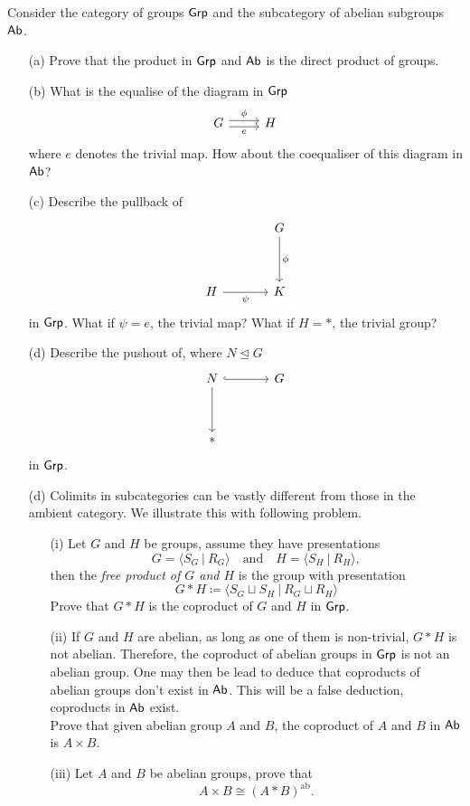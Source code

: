 \begin{problem}\label{prob 6.5}
Consider the category of groups $\mathsf{Grp}$ and the subcategory of abelian subgroups $\mathsf{Ab}$.
\begin{itemize}
\item[(a)] Prove that the product in $\mathsf{Grp}$ and $\mathsf{Ab}$ is the direct product of groups.
\item[(b)] What is the equalise of the diagram in $\mathsf{Grp}$
\[\begin{tikzcd}
G \arrow[r, "\phi", shift left] \arrow[r, "e"', shift right] & H
\end{tikzcd}\]
where $e$ denotes the trivial map. How about the coequaliser of this diagram in $\mathsf{Ab}$?
\item[(c)] Describe the pullback of
\[\begin{tikzcd}[row sep=huge, column sep = large]
& G \arrow[d, "\phi"] \\
H \arrow[r, "\psi"']                                              & K         
\end{tikzcd}\]
in $\mathsf{Grp}$. What if $\psi = e$, the trivial map? What if $H = *$, the trivial group?
\item[(d)] Describe the pushout of, where $N \unlhd G$
\[\begin{tikzcd}[row sep=huge, column sep = large]
N\arrow[d] \arrow[r, hook] & G \\
*                                              &    
\end{tikzcd}\]
in $\mathsf{Grp}$.
\item[(d)] Colimits in subcategories can be vastly different from those in the ambient category. We illustrate this with following problem. 
\begin{itemize}
\item[(i)] Let $G$ and $H$ be groups, assume they have presentations
\[G = \langle S_G\ \vert\ R_G\rangle\quad \text{and} \quad H = \langle S_H\ \vert\ R_H\rangle,\]
then the \emph{free product of $G$ and $H$} is the group with presentation
\[G*H \coloneqq \langle S_G \sqcup S_H\ \vert\ R_G\sqcup R_H\rangle\]
Prove that $G*H$ is the coproduct of $G$ and $H$ in $\mathsf{Grp}$.
\item[(ii)] If $G$ and $H$ are abelian, as long as one of them is non-trivial, $G * H$ is not abelian. Therefore, the coproduct of abelian groups in $\mathsf{Grp}$ is not an abelian group. One may then be lead to deduce that coproducts of abelian groups don't exist in $\mathsf{Ab}$. This will be a false deduction, coproducts in $\mathsf{Ab}$ exist.\\[1em]
Prove that given abelian group $A$ and $B$, the coproduct of $A$ and $B$ in $\mathsf{Ab}$ is $A \times B$. 
\item[(iii)] Let $A$ and $B$ be abelian groups, prove that \[A \times B \cong (A*B)^{\text{ab}}.\]
\end{itemize}
\end{itemize}
\end{problem}

